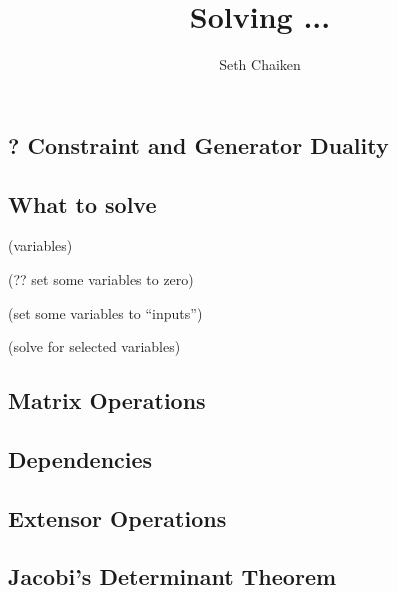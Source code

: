 \documentclass{article}
\title{Solving ... }
\author{Seth Chaiken}
\begin{document}
\maketitle
\subsection{? Constraint and Generator Duality}


\subsection{What to solve}
(variables)

(?? set some variables to zero)

(set some variables to ``inputs'')

(solve for selected variables) 

\subsection{Matrix Operations}
\subsection{Dependencies}
\subsection{Extensor Operations}
\subsection{Jacobi's Determinant Theorem}
\end{document}
